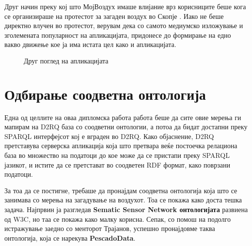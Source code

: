 \documentclass{uvamscse}
\begin{document}
Друг начин преку кој што МојВоздух имаше влијание врз корисниците беше кога се организираше на протестот за загаден воздух во Скопје \cite{protest}. Иако не беше директно влучен во протестот, верувам дека со самото медиумско изложување и зголемената популарност на апликацијата, придонесе до формирање на едно вакво движење кое ја има истата цел како и апликацијата.

\begin{figure}[H]
\centering
  \caption{Друг поглед на апликацијата}
  \label{fig:protest}
\end{figure}
\chapter{Одбирање соодветна онтологија}

Една од целлите на оваа дипломска работа работа беше да сите овие мерења ги мапирам на D2RQ база со соодветни онтологии, а потоа да бидат достапни преку SPARQL интерфејсот кој е вграден во D2RQ. Како објаснение, D2RQ претставува серверска апликација која што претвара веќе постоечка релациона база во множество на податоци до кое може да се пристапи преку SPARQL јазикот, и истите да се претстават во соодветен RDF формат, како поврзани податоци.
\vspace{5mm}


За тоа да се постигне, требаше да пронајдам соодветна онтологија која што се занимава со мерења на загадување на воздухот. Тоа се покажа како доста тешка задача. Најпрвин ја разгледав \textbf{Sematic Sensor Network онтологијата} развиена од W3C, но таа се покажа како малку корисна. Сепак, со помош на подолго истражување заедно со менторот Трајанов, успешно пронајдовме таква онтологија, која се нарекува \textbf{PescadoData}.
\end{document}
